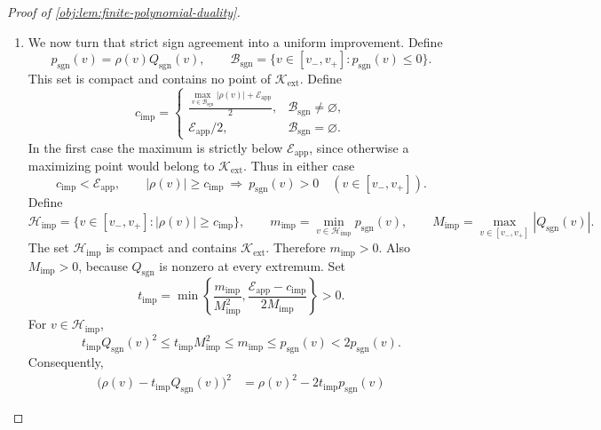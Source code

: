 \begin{proof}[Proof of \cref{obj:lem:finite-polynomial-duality}]
\begin{enumerate}
For any \(v\in\mathcal K_{\mathrm{ext}}\), choose a covering center \(c_j\). Opposite signs at \(v\) and \(c_j\) would imply
\[
|v-c_j|>\delta_{\mathrm{ext}},
\]
contradicting \(|v-c_j|<\varepsilon_{\mathrm{ext}}\). Hence
\[
\rho(v)=s_j\mathcal E_{\mathrm{app}},
\qquad
\rho(v)Q_{\mathrm{sgn}}(v)
=
\mathcal E_{\mathrm{app}}\,s_jQ_{\mathrm{sgn}}(v)>0.
\]
This completes the sign-polynomial construction.

\item We now turn that strict sign agreement into a uniform improvement. Define
\[
p_{\mathrm{sgn}}(v)=\rho(v)Q_{\mathrm{sgn}}(v),
\qquad
\mathcal B_{\mathrm{sgn}}
=
\{v\in[v_-,v_+]:p_{\mathrm{sgn}}(v)\le0\}.
\]
This set is compact and contains no point of \(\mathcal K_{\mathrm{ext}}\). Define
\[
c_{\mathrm{imp}}
=
\begin{cases}
\displaystyle
\frac{\max_{v\in\mathcal B_{\mathrm{sgn}}}|\rho(v)|
+\mathcal E_{\mathrm{app}}}{2},
&\mathcal B_{\mathrm{sgn}}\ne\varnothing,\\[3mm]
\mathcal E_{\mathrm{app}}/2,
&\mathcal B_{\mathrm{sgn}}=\varnothing.
\end{cases}
\]
In the first case the maximum is strictly below \(\mathcal E_{\mathrm{app}}\), since otherwise a maximizing point would belong to \(\mathcal K_{\mathrm{ext}}\). Thus in either case
\[
c_{\mathrm{imp}}<\mathcal E_{\mathrm{app}},
\qquad
|\rho(v)|\ge c_{\mathrm{imp}}
\ \Longrightarrow\
p_{\mathrm{sgn}}(v)>0
\quad(v\in[v_-,v_+]).
\]
Define
\begingroup\small
\[
\mathcal H_{\mathrm{imp}}
=
\{v\in[v_-,v_+]:|\rho(v)|\ge c_{\mathrm{imp}}\},
\qquad
m_{\mathrm{imp}}
=
\min_{v\in\mathcal H_{\mathrm{imp}}}p_{\mathrm{sgn}}(v),
\qquad
M_{\mathrm{imp}}
=
\max_{v\in[v_-,v_+]}|Q_{\mathrm{sgn}}(v)|.
\]
\endgroup
The set \(\mathcal H_{\mathrm{imp}}\) is compact and contains \(\mathcal K_{\mathrm{ext}}\). Therefore \(m_{\mathrm{imp}}>0\). Also \(M_{\mathrm{imp}}>0\), because \(Q_{\mathrm{sgn}}\) is nonzero at every extremum. Set
\[
t_{\mathrm{imp}}
=
\min\left\{
\frac{m_{\mathrm{imp}}}{M_{\mathrm{imp}}^2},
\frac{\mathcal E_{\mathrm{app}}-c_{\mathrm{imp}}}{2M_{\mathrm{imp}}}
\right\}>0.
\]
For \(v\in\mathcal H_{\mathrm{imp}}\),
\[
t_{\mathrm{imp}}Q_{\mathrm{sgn}}(v)^2
\le t_{\mathrm{imp}}M_{\mathrm{imp}}^2
\le m_{\mathrm{imp}}
\le p_{\mathrm{sgn}}(v)
<2p_{\mathrm{sgn}}(v).
\]
Consequently,
\[
\begin{aligned}
\bigl(\rho(v)-t_{\mathrm{imp}}Q_{\mathrm{sgn}}(v)\bigr)^2
&=\rho(v)^2-2t_{\mathrm{imp}}p_{\mathrm{sgn}}(v)

\end{aligned}\]
\end{enumerate}
\end{proof}
